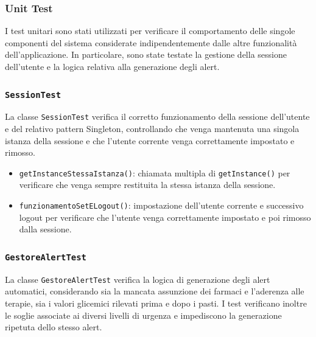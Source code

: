 \subsubsection{Unit Test}

I test unitari sono stati utilizzati per verificare il comportamento delle singole componenti del sistema considerate indipendentemente dalle altre funzionalità dell'applicazione. In particolare, sono state testate la gestione della sessione dell'utente e la logica relativa alla generazione degli alert.

\subsubsection*{\texttt{SessionTest}}

La classe \texttt{SessionTest} verifica il corretto funzionamento della sessione dell'utente e del relativo pattern Singleton, controllando che venga mantenuta una singola istanza della sessione e che l'utente corrente venga correttamente impostato e rimosso.

\begin{itemize}
	
	\item \texttt{getInstanceStessaIstanza()}: chiamata multipla di \texttt{getInstance()} per verificare che venga sempre restituita la stessa istanza della sessione.
	
	\item \texttt{funzionamentoSetELogout()}: impostazione dell'utente corrente e successivo logout per verificare che l'utente venga correttamente impostato e poi rimosso dalla sessione.
	
\end{itemize}

\subsubsection*{\texttt{GestoreAlertTest}}

La classe \texttt{GestoreAlertTest} verifica la logica di generazione degli alert automatici, considerando sia la mancata assunzione dei farmaci e l'aderenza alle terapie, sia i valori glicemici rilevati prima e dopo i pasti. I test verificano inoltre le soglie associate ai diversi livelli di urgenza e impediscono la generazione ripetuta dello stesso alert.


